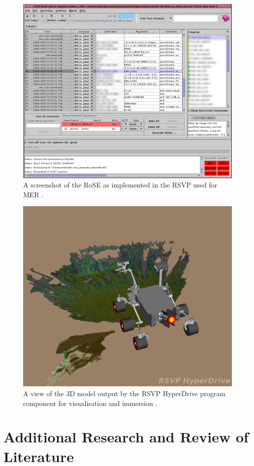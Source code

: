       \begin{figure}[H]
        \centering
        \includegraphics[width=0.7\linewidth]{figures/litreview-RoSE}
        \caption[A screenshot of the RoSE as implemented in the RSVP used for MER.]{A screenshot of the RoSE as implemented in the RSVP used for MER \cite{fig:litreview-rose_cite}.}
        \label{fig:litreview-rose}
      \end{figure}
      
      
      \begin{figure}[H]
        \centering
        \includegraphics[width=0.7\linewidth]{figures/litreview-hyperdriveCrop}
        \caption[A view of the 3D model output by the RSVP HyperDrive program component for visualisation and immersion.]{A view of the 3D model output by the RSVP HyperDrive program component for visualisation and immersion \cite{fig:litreview-litreview-hyperdrivecrop_cite}.}
        \label{fig:litreview-hyperdrivecrop}
      \end{figure}

  
  \section{Additional Research and Review of Literature}
